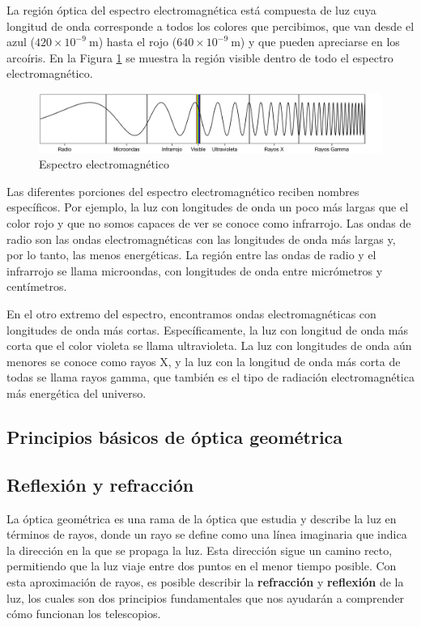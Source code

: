 La región óptica del espectro electromagnética está compuesta de luz cuya longitud de onda corresponde a todos los colores que percibimos, que van desde el azul ($ 420 \times 10^{-9} ~\mathrm{m} $) hasta el rojo ($ 640\times 10^{-9} ~\mathrm{m} $) y que pueden apreciarse en los arcoíris. En la Figura \ref{fig:em_spectrum} se muestra la región visible dentro de todo el espectro electromagnético.

\begin{figure}[htb]
  \centering
  \includegraphics[width=\textwidth]{figures/em_spectrum.png}
  \caption{Espectro electromagnético}
  \label{fig:em_spectrum}
\end{figure}

Las diferentes porciones del espectro electromagnético reciben nombres específicos. Por ejemplo, la luz con longitudes de onda un poco más largas que el color rojo y que no somos capaces de ver se conoce como infrarrojo. Las ondas de radio son las ondas electromagnéticas con las longitudes de onda más largas y, por lo tanto, las menos energéticas. La región entre las ondas de radio y el infrarrojo se llama microondas, con longitudes de onda entre micrómetros y centímetros.

En el otro extremo del espectro, encontramos ondas electromagnéticas con longitudes de onda más cortas. Específicamente, la luz con longitud de onda más corta que el color violeta se llama ultravioleta. La luz con longitudes de onda aún menores se conoce como rayos X, y la luz con la longitud de onda más corta de todas se llama rayos gamma, que también es el tipo de radiación electromagnética más energética del universo.

\subsection{Principios básicos de óptica geométrica}
\subsection{Reflexión y refracción}
La óptica geométrica es una rama de la óptica que estudia y describe la luz en términos de rayos, donde un rayo se define como una línea imaginaria que indica la dirección en la que se propaga la luz. Esta dirección sigue un camino recto, permitiendo que la luz viaje entre dos puntos en el menor tiempo posible. Con esta aproximación de rayos, es posible describir la \textbf{refracción} y \textbf{reflexión} de la luz, los cuales son dos principios fundamentales que nos ayudarán a comprender cómo funcionan los telescopios. 

